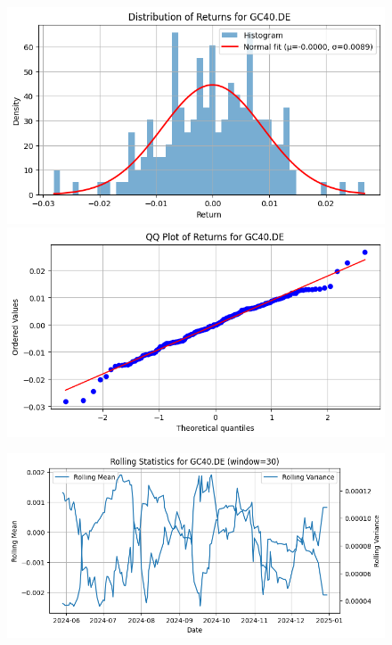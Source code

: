 \documentclass{article}%
\begin{document}
\begin{figure}[htbp]%
\begin{minipage}{0.49\textwidth}%
\includegraphics[width=\linewidth]{ticker_images/GC40.DE_return_distribution.png}%
\end{minipage}%
\begin{minipage}{0.49\textwidth}%
\includegraphics[width=\linewidth]{ticker_images/GC40.DE_qq_plot.png}%
\end{minipage}%
\end{figure}

%


\begin{figure}[htbp]%
\begin{minipage}{0.49\textwidth}%
\includegraphics[width=\linewidth]{ticker_images/GC40.DE_rolling_stats.png}%
\end{minipage}%
\end{figure}
\end{document}
